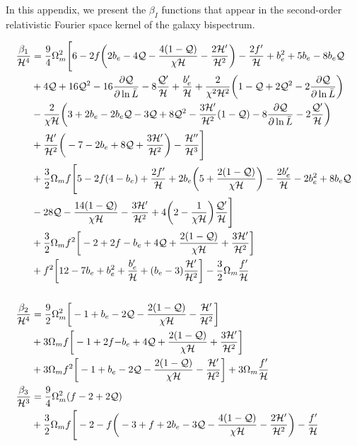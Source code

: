 In this appendix, we present the $\beta_I$ functions that appear in the second-order relativistic Fourier space kernel of the galaxy bispectrum. 

\begin{align} 
\frac{\beta_{1}}{\mathcal{H}^{4}} &= \frac{9}{4}\Omega_{m}^{2}\Bigg[6-2f\bigg(2b_{e}-4\Q-\frac{4(1-\Q)}{\chi\cH}-\frac{2\cH'}{\cH^{2}}\bigg)-\frac{2f'}{\cH}+b_{e}^{2}+5b_{e}-8b_{e}\Q \nonumber \\
&+ 4\Q + 16\Q^{2} - 16\frac{\p \Q}{\p \ln{\bar{L}}} - 8\frac{\Q'}{\cH} + \frac{b_{e}'}{\cH}+\frac{2}{\chi^{2}\cH^{2}}\bigg(1-\Q+2\Q^{2}-2\frac{\p \Q}{\p \ln{\bar{L}}}\bigg)
 \nonumber\\ 
& - \frac{2}{\chi\cH}\bigg(3+2b_{e}-2b_{e}\Q-3\Q +8\Q^{2}-\frac{3\cH'}{\cH^{2}}(1-\Q) -8\frac{\p \Q}{\p \ln{\bar{L}}} - 2\frac{\Q'}{\cH}\bigg) \nonumber \\
& + \frac{\cH'}{\cH^{2}}\bigg(-7-2b_{e}+8\Q+\frac{3\cH'}{\cH^{2}}\bigg) - \frac{\cH''}{\cH^{3}}\Bigg] \nonumber \\
&  +\frac{3}{2}\Omega_{m}f\Bigg[5-2f(4-b_{e})+\frac{2f'}{\cH}+2b_{e}\bigg(5+\frac{2(1-\Q)}{\chi\cH}\bigg)-\frac{2b_{e}'}{\cH} -2b_{e}^{2} + 8b_{e}\Q \nonumber \\
&- 28\Q - \frac{14(1-\Q)}{\chi\cH}-\frac{3\cH'}{\cH^{2}} +4\bigg(2-\frac{1}{\chi\cH}\bigg)\frac{\Q'}{\cH}\Bigg] \nonumber \\
&  +\frac{3}{2}\Omega_{m}f^{2}\bigg[-2+2f-b_{e}+4\Q+\frac{2(1-\Q)}{\chi\cH}+\frac{3\cH'}{\cH^{2}}\bigg] \nonumber \\
&  +f^{2}\bigg[12-7b_{e}+b_{e}^{2}+\frac{b_{e}'}{\cH}+(b_{e}-3)\frac{\cH'}{\cH^{2}}\bigg] - \frac{3}{2}\Omega_{m}\frac{f'}{\cH} \\
\nonumber\\
\frac{\beta_{2}}{\cH^{4}} &= \frac{9}{2}\Omega_{m}^{2}\bigg[-1+b_{e} - 2\Q - \frac{2(1-\Q)}{\chi\cH} - \frac{\cH'}{\cH^{2}}\bigg] \nonumber \\
& + 3\Omega_{m}f\bigg[-1+2f{-b_{e}}+4\Q+\frac{2(1-\Q)}{\chi\cH}+\frac{3\cH'}{\cH^{2}}\bigg] \nonumber \\
&  +3\Omega_{m}f^{2}\bigg[-1+b_{e}-2\Q-\frac{2(1-\Q)}{\chi\cH}-\frac{\cH'}{\cH^{2}}\bigg] + 3\Omega_{m}\frac{f'}{\cH}\; \\ 
\frac{\beta_{3}}{\mathcal{H}^{3}} &= \frac{9}{4}\Omega_{m}^{2}(f-2+2\Q) \nonumber \\
&  + \frac{3}{2}\Omega_{m}f\Bigg[-2 -f\bigg(-3+f+2b_{e}-3\Q-\frac{4(1-\Q)}{\chi\cH}-\frac{2\cH'}{\cH^{2}}\bigg)-\frac{f'}{\cH}\nonumber \\

\end{align}
